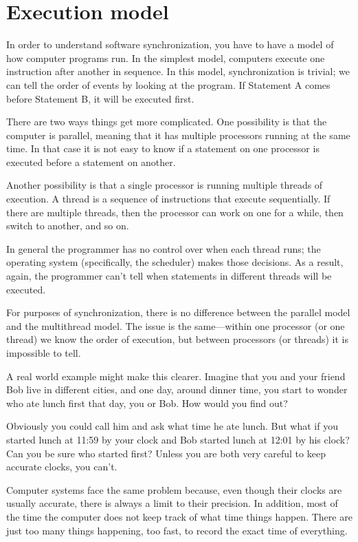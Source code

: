 \documentclass{book}
\begin{document}
\section {Execution model}

In order to understand software synchronization, you have to
have a model of how computer programs run.  In the simplest
model, computers execute one instruction after another in
sequence.  In this model, synchronization is trivial; we can
tell the order of events by looking at the program.  If Statement
A comes before Statement B, it will be executed first.

There are two ways things get more complicated.  One possibility
is that the computer is parallel, meaning that it has multiple
processors running at the same time.  In that case it is not easy
to know if a statement on one processor is executed before a
statement on another.

Another possibility is that a single processor is running multiple
threads of execution.  A thread is a sequence of instructions
that execute sequentially.  If there are multiple threads, then
the processor can work on one for a while, then switch to
another, and so on.

In general the programmer has no control over when each thread runs;
the operating system (specifically, the scheduler) makes those
decisions.  As a result, again, the programmer can't tell when
statements in different threads will be executed.

For purposes of synchronization, there is no difference between the
parallel model and the multithread model.  The issue is the
same---within one processor (or one thread) we know the order of
execution, but between processors (or threads) it is impossible to
tell.

A real world example might make this clearer.  Imagine that you and
your friend Bob live in different cities, and one day, around dinner
time, you start to wonder who ate lunch first that day, you or Bob.
How would you find out?

Obviously you could call him and ask what time he ate lunch.  But what
if you started lunch at 11:59 by your clock and Bob started lunch at
12:01 by his clock?  Can you be sure who started first?  Unless you
are both very careful to keep accurate clocks, you can't.

Computer systems face the same problem because, even though their
clocks are usually accurate, there is always a limit to their
precision.  In addition, most of the time the computer does not keep
track of what time things happen.  There are just too many things
happening, too fast, to record the exact time of everything.
\end{document}
